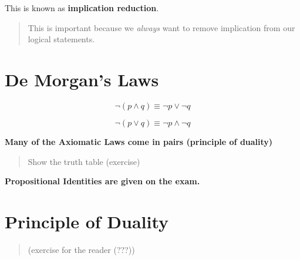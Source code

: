 \documentclass{article}
\begin{document}
This is known as \textbf{implication reduction}.

\begin{quote}
    This is important because we \textit{always} want to remove implication from our logical statements.
\end{quote}

\section{De Morgan's Laws}

\begin{equation}
  \neg (p \land q) \equiv \neg p \lor \neg q
\end{equation}

\begin{equation}
  \neg (p \lor q) \equiv \neg p \land \neg q
\end{equation}

\textbf{Many of the Axiomatic Laws come in pairs (principle of duality)}

\begin{quote}
    Show the truth table (exercise)
\end{quote}

\textbf{Propositional Identities are given on the exam.}

\section{Principle of Duality}
\begin{quote}
    (exercise for the reader (???))
\end{quote}
\end{document}
